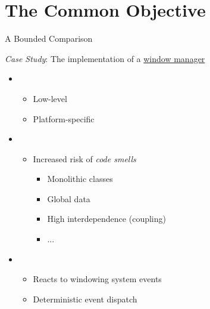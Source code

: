 
\section{The Common Objective}

\begin{secframe}{A Bounded Comparison}

    \textit{Case Study}: The implementation of a \underline{window manager}

    \begin{itemize}
        \item {}\\
            \begin{itemize}
                \item Low-level
                \item Platform-specific
            \end{itemize}

        \item {}\\
            \begin{itemize}
                \item Increased risk of \textit{code smells}
                    \begin{itemize}
                        \item Monolithic classes
                        \item Global data
                        \item High interdependence (coupling)
                        \item ...
                    \end{itemize}
            \end{itemize}

        \item {}\\
            \begin{itemize}
                \item Reacts to windowing system events
                \item Deterministic event dispatch
            \end{itemize}
    \end{itemize}

    \vfill

\end{secframe}

